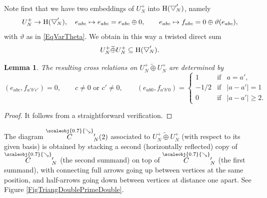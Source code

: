 \documentclass[11pt, reqno]{amsart}
\newtheorem{lemma}[theorem]{Lemma}
\theoremstyle{definition}
\numberwithin{equation}{section}
\newcommand{\Nilp}{U}
\newcommand{\sears}{\scaleobj{0.7}{\searrow}}
\newcommand{\wseC}{\overset{\sears}{C}\,\!'}
\newcommand{\wbtd}[1]{\raisebox{\depth}{$\bigtriangledown'$\!\!}_{#1}}
\newcommand{\Heiss}{\mathrm{H}}
\begin{document}
Note first that we have two embeddings of $\Nilp_N^+$ into $\Heiss(\wbtd{N})$, namely 
\begin{equation}\label{EqTwoEmb}
\Nilp_N^+\rightarrow \Heiss(\wbtd{N}),\quad  e_{abc} \mapsto e_{abc} =  e_{abc} \oplus 0,\qquad e_{abc} \mapsto f_{abc} = 0 \oplus \vartheta(e_{abc}), 
\end{equation}
with $\vartheta$ as in \eqref{EqVarTheta}. We obtain in this way a twisted direct sum 
\begin{equation}\label{EqEmbTwistSum}
\Nilp_N^+\widetilde{\oplus}\Nilp_N^+ \subseteq \Heiss(\wbtd{N}).
\end{equation}
\begin{lemma}
The resulting cross relations on $\Nilp_N^+\widetilde{\oplus}\Nilp_N^+$ are determined by 
\begin{equation}\label{EqCrossNilp}
(e_{abc},f_{a'b'c'}) = 0,\qquad c\neq 0\textrm{ or }c'\neq 0,\qquad 
(e_{ab0},f_{a'b'0}) = \left\{\begin{array}{lll} 1 & \textrm{if}& a=a',\\ -1/2 &\textrm{if}& |a-a'|=1\\
0&\textrm{if}&|a-a'|\geq 2.\end{array}\right.
\end{equation}
\end{lemma}
\begin{proof}
It follows from a straightforward verification.
\end{proof}

The diagram $\wseC_N(2)$ associated to $\Nilp_N^+\widetilde{\oplus}\Nilp_N^+$ (with respect to its given basis) is obtained by stacking a second (horizontally reflected) copy of $\wseC_N$ (the second summand) on top of $\wseC_N$ (the first summand), with connecting full arrows going up between vertices at the same position, and half-arrows going down between vertices at distance one apart. See Figure \ref{FigTriangDoublePrimeDouble}.
\end{document}
